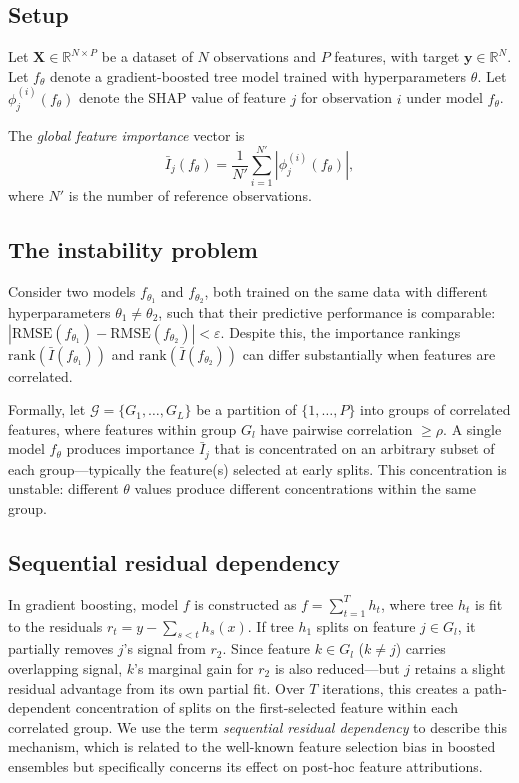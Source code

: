 \documentclass[11pt]{article}
\newcommand{\rhovar}{\rho}
\begin{document}
\subsection{Setup}

Let $\mathbf{X} \in \mathbb{R}^{N \times P}$ be a dataset of $N$
observations and $P$ features, with target $\mathbf{y} \in \mathbb{R}^N$.
Let $f_\theta$ denote a gradient-boosted tree model trained with
hyperparameters $\theta$. Let $\phi_j^{(i)}(f_\theta)$ denote the SHAP
value of feature $j$ for observation $i$ under model $f_\theta$.

The \emph{global feature importance} vector is
\begin{equation}
  \bar{I}_j(f_\theta) = \frac{1}{N'} \sum_{i=1}^{N'} |\phi_j^{(i)}(f_\theta)|,
  \label{eq:global_importance}
\end{equation}
where $N'$ is the number of reference observations.

\subsection{The instability problem}

Consider two models $f_{\theta_1}$ and $f_{\theta_2}$, both trained on the
same data with different hyperparameters $\theta_1 \neq \theta_2$, such
that their predictive performance is comparable:
$|\text{RMSE}(f_{\theta_1}) - \text{RMSE}(f_{\theta_2})| < \varepsilon$.
Despite this, the importance rankings
$\text{rank}(\bar{I}(f_{\theta_1}))$ and
$\text{rank}(\bar{I}(f_{\theta_2}))$ can differ substantially when
features are correlated.

Formally, let $\mathcal{G} = \{G_1, \ldots, G_L\}$ be a partition of
$\{1, \ldots, P\}$ into groups of correlated features, where features
within group $G_l$ have pairwise correlation $\geq \rhovar$. A single
model $f_\theta$ produces importance $\bar{I}_j$ that is concentrated on
an arbitrary subset of each group---typically the feature(s) selected at
early splits. This concentration is unstable: different $\theta$ values
produce different concentrations within the same group.

\subsection{Sequential residual dependency}

In gradient boosting, model $f$ is constructed as $f =
\sum_{t=1}^{T} h_t$, where tree $h_t$ is fit to the residuals
$r_t = y - \sum_{s<t} h_s(x)$. If tree $h_1$ splits on feature $j \in
G_l$, it partially removes $j$'s signal from $r_2$. Since feature $k
\in G_l$ ($k \neq j$) carries overlapping signal, $k$'s marginal gain
for $r_2$ is also reduced---but $j$ retains a slight residual advantage
from its own partial fit. Over $T$ iterations, this creates a
path-dependent concentration of splits on the first-selected feature
within each correlated group. We use the term \emph{sequential residual
dependency} to describe this mechanism, which is related to the
well-known feature selection bias in boosted ensembles but specifically
concerns its effect on post-hoc feature attributions.
\end{document}
